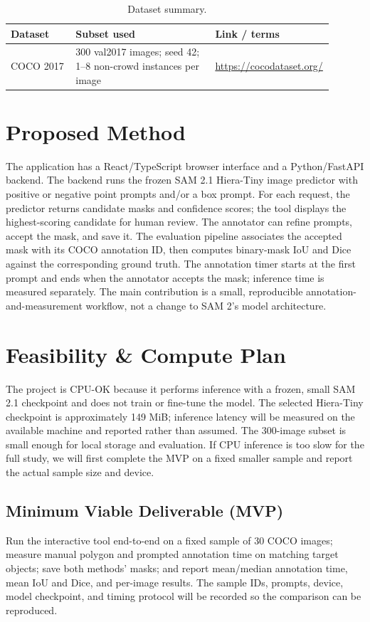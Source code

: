 \documentclass[11pt]{article}
\begin{document}
\begin{table}[ht]
\centering
\caption{Dataset summary.}
\label{tab:data}
\begin{tabular}{@{}p{0.20\linewidth}p{0.43\linewidth}p{0.27\linewidth}@{}}
\toprule
\textbf{Dataset} & \textbf{Subset used} & \textbf{Link / terms} \\
\midrule
COCO 2017 & 300 val2017 images; seed 42; 1--8 non-crowd instances per image & \url{https://cocodataset.org/} \\
\bottomrule
\end{tabular}
\end{table}

\section{Proposed Method}
\label{sec:method}
The application has a React/TypeScript browser interface and a Python/FastAPI
backend. The backend runs the frozen SAM 2.1 Hiera-Tiny image predictor with
positive or negative point prompts and/or a box prompt. For each request, the
predictor returns candidate masks and confidence scores; the tool displays the
highest-scoring candidate for human review. The annotator can refine prompts,
accept the mask, and save it. The evaluation pipeline associates the accepted
mask with its COCO annotation ID, then computes binary-mask IoU and Dice against
the corresponding ground truth. The annotation timer starts at the first prompt
and ends when the annotator accepts the mask; inference time is measured
separately. The main contribution is a small, reproducible
annotation-and-measurement workflow, not a change to SAM 2's model architecture.

\section{Feasibility \& Compute Plan}
\label{sec:feasibility}
The project is CPU-OK because it performs inference with a frozen, small SAM 2.1
checkpoint and does not train or fine-tune the model. The selected Hiera-Tiny
checkpoint is approximately 149 MiB; inference latency will be measured on the
available machine and reported rather than assumed. The 300-image subset is
small enough for local storage and evaluation. If CPU inference is too slow for
the full study, we will first complete the MVP on a fixed smaller sample and
report the actual sample size and device.

\subsection{Minimum Viable Deliverable (MVP)}
Run the interactive tool end-to-end on a fixed sample of 30 COCO images; measure
manual polygon and prompted annotation time on matching target objects; save
both methods' masks; and report mean/median annotation time, mean IoU and Dice,
and per-image results. The sample IDs, prompts, device, model checkpoint, and
timing protocol will be recorded so the comparison can be reproduced.
\end{document}
